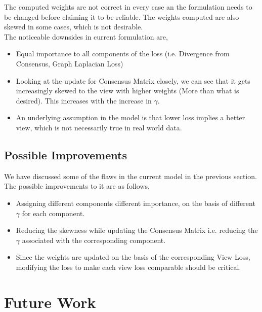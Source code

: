 \documentclass[a4paper]{article}
\begin{document}
	The computed weights are not correct in every case an the formulation needs to be changed before claiming it to be reliable. The weights computed are also skewed in some cases, which is not desirable.\\
	The noticeable downsides in current formulation are, 
	\begin{itemize}
	\item Equal importance to all components of the loss (i.e. Divergence from Consensus, Graph Laplacian Loss)
	\item Looking at the update for Consensus Matrix closely, we can see that it gets increasingly skewed to the view with higher weights (More than what is desired). This increases with the increase in $\gamma$. 
	\item An underlying assumption in the model is that lower loss implies a better view, which is not necessarily true in real world data.
	\end{itemize}
	
	\subsection{Possible Improvements}
	
	We have discussed some of the flaws in the current model in the previous section. The possible improvements to it are as follows,
	\begin{itemize}
	\item Assigning different components different importance, on the basis of different $\gamma$ for each component.
	\item Reducing the skewness while updating the Consensus Matrix i.e. reducing the $\gamma$ associated with the corresponding component.
	\item Since the weights are updated on the basis of the corresponding View Loss, modifying the loss to make each view loss comparable should be critical.
	\end{itemize}
	
	\section{Future Work}	
	
\end{document}
